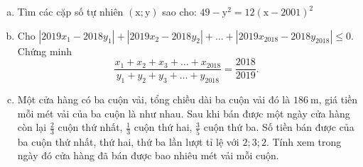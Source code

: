 \begin{bt}
	\hfill
	\begin{enumerate}[a.]
		\item Tìm các cặp số tự nhiên $(\mathrm{x} ; \mathrm{y})$ sao cho: $49-\mathrm{y}^2=12(\mathrm{x}-2001)^2$
        \item Cho $\left|2019 x_1-2018 y_1\right|+\left|2019 x_2-2018 y_2\right|+\ldots+\left|2019 x_{2018}-2018 y_{2018}\right| \leq 0$. Chứng minh
        $$
        \frac{x_1+x_2+x_3+\ldots+x_{2018}}{y_1+y_2+y_3+\ldots+y_{2018}}=\frac{2018}{2019} \text {. }
        $$
        \item Một cửa hàng có ba cuộn vải, tổng chiều dài ba cuộn vải đó là $186 \mathrm{~m}$, giá tiền mỗi mét vải của ba cuộn là như nhau. Sau khi bán được một ngày cửa hàng còn lại $\frac{2}{3}$ cuộn thứ nhất, $\frac{1}{3}$ cuộn thứ hai, $\frac{3}{5}$ cuộn thứ ba. Số tiền bán được của ba cuộn thứ nhất, thứ hai, thứ ba lần lượt tỉ lệ với $2 ; 3 ; 2$. Tính xem trong ngày đó cửa hàng đã bán được bao nhiêu mét vải mỗi cuộn.
	\end{enumerate}
\end{bt}
